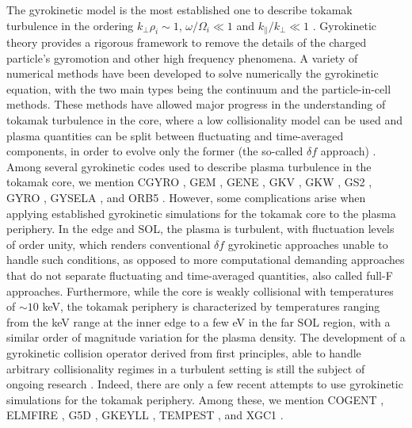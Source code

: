 The gyrokinetic model is the most established one to describe tokamak turbulence in the ordering $k_\perp \rho_i \sim 1$, $\omega/\Omega_i \ll 1$ and $k_\parallel/k_\perp \ll 1$ \citep{Catto1978a,Frieman1982,Brizard2007a,Parra2008,Hahm2009}.
%
Gyrokinetic theory provides a rigorous framework to remove the details of the charged particle's gyromotion and other high frequency phenomena.
%
A variety of numerical methods have been developed to solve numerically the gyrokinetic equation, with the two main types being the continuum \citep{Jenko2001} and the particle-in-cell \citep{Lee1987} methods.
%
These methods have allowed major progress in the understanding of tokamak turbulence in the core, where a low collisionality model can be used and plasma quantities can be split between fluctuating and time-averaged components, in order to evolve only the former (the so-called $\delta f$ approach) \citep{Kinsey2011}.
%
Among several gyrokinetic codes used to describe plasma turbulence in the tokamak core, we mention CGYRO \citep{Candy2016}, GEM \citep{Parker1999}, GENE \citep{Jenko2000a,Gorler2011}, GKV \citep{Watanabe2006}, GKW \citep{Peeters2009}, GS2 \citep{Kotschenreuther1995,Dorland2000a}, GYRO \citep{Candy2003}, GYSELA \citep{Latu2007}, and ORB5 \citep{Jolliet2007}.
%
However, some complications arise when applying established gyrokinetic simulations for the tokamak core to the plasma periphery.
%
In the edge and SOL, the plasma is turbulent, with fluctuation levels of order unity, which renders conventional $\delta f$ gyrokinetic approaches unable to handle such conditions, as opposed to more computational demanding approaches that do not separate fluctuating and time-averaged quantities, also called full-F approaches.
%
Furthermore, while the core is weakly collisional with temperatures of $\sim 10$ keV, the tokamak periphery is characterized by temperatures ranging from the keV range at the inner edge to a few eV in the far SOL region, with a similar order of magnitude variation for the plasma density.
%
The development of a gyrokinetic collision operator derived from first principles, able to handle arbitrary collisionality regimes in a turbulent setting is still the subject of ongoing research \citep{Hirvijoki2017}.
%
Indeed, there are only a few recent attempts to use gyrokinetic simulations for the tokamak periphery.
%
Among these, we mention COGENT \citep{Dorf2013}, ELMFIRE \citep{Heikkinen2008}, G5D \citep{Kawai2017}, GKEYLL \citep{Shi2017}, TEMPEST \citep{Xu2010a}, and XGC1 \citep{Chang2009}.

